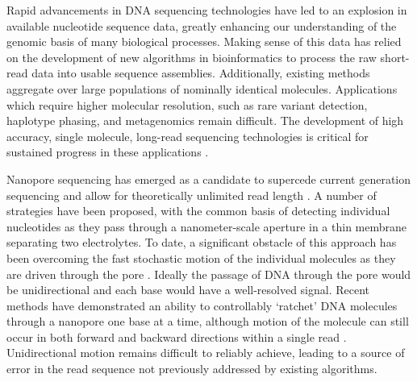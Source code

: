\documentclass{biophys_letter}
\begin{document}
\vspace*{2.7pt}

\twocolumn


Rapid advancements in DNA sequencing technologies have led to an explosion in available nucleotide sequence data, greatly enhancing our understanding of the genomic basis of many biological processes.
Making sense of this data has relied on the development of new algorithms in bioinformatics to process the raw short-read data into usable sequence assemblies.
Additionally, existing methods aggregate over large populations of nominally identical molecules.
Applications which require higher molecular resolution, such as rare variant detection, haplotype phasing, and metagenomics remain difficult.
The development of high accuracy, single molecule, long-read sequencing technologies is critical for sustained progress in these applications \cite{Mak:2012}.

Nanopore sequencing has emerged as a candidate to supercede current generation sequencing and allow for theoretically unlimited read length \cite{Branton:2008}.
A number of strategies have been proposed, with the common basis of detecting individual nucleotides as they pass through a nanometer-scale aperture in a thin membrane separating two electrolytes.
To date, a significant obstacle of this approach has been overcoming the fast stochastic motion of the individual molecules as they are driven through the pore \cite{Venkatesan:2011, Lu:2011}.
Ideally the passage of DNA through the pore would be unidirectional and each base would have a well-resolved signal.
Recent methods have demonstrated an ability to controllably `ratchet' DNA molecules through a nanopore one base at a time, although motion of the molecule can still occur in both forward and backward directions within a single read \cite{Luan:2011, Olasagasti:2010, Cherf:2012}.
Unidirectional motion remains difficult to reliably achieve, leading to a source of error in the read sequence not previously addressed by existing algorithms.
\end{document}
